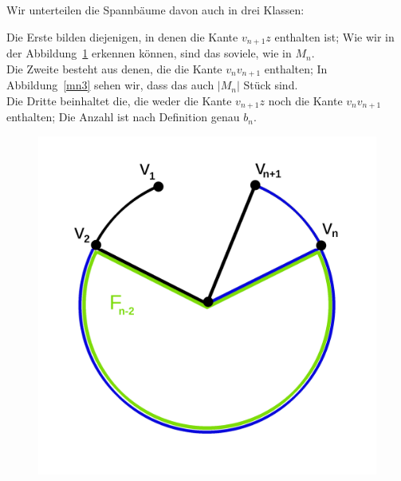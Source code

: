 Wir unterteilen die Spannbäume davon auch in drei Klassen:\\
\par
\begingroup
\leftskip=20pt
\rightskip=20pt
\noindent
Die Erste bilden diejenigen, in denen die Kante $v_{n+1}z$ enthalten ist; Wie wir in der Abbildung~\ref{mn2} erkennen können, sind das soviele, wie in $M_n$.\\
Die Zweite besteht aus denen, die die Kante $v_nv_{n+1}$ enthalten; In Abbildung~\ref{mn3} sehen wir, dass das auch $|M_n|$ Stück sind.\\
Die Dritte beinhaltet die, die weder die Kante $v_{n+1}z$ noch die Kante $v_nv_{n+1}$ enthalten; Die Anzahl ist nach Definition genau $b_n$.\\
\par
\endgroup
\begin{figure}[H]
    \centering
    \begin{minipage}{0.45\textwidth}
        \centering
        \includegraphics[width=1\textwidth]{mn2.png}
        \caption{}
 \label{mn2} %
    \end{minipage}\hfill
    \begin{minipage}{0.45\textwidth}
        \centering

\end{minipage}
\end{figure}
